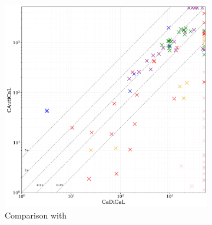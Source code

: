 \begin{figure}[!t]
    \centering
    \begin{subfigure}[t]{0.45\textwidth}
            \centering
            \includegraphics[width=\textwidth]{figs/cadical_vs_cautical_interesting.jpg}
            \caption{Comparison with \cadical}
            \label{fig:cautical-vs-cadical}
    \end{subfigure}
    \begin{subfigure}[t]{0.45\textwidth}
        \centering

\end{subfigure}
\end{figure}
